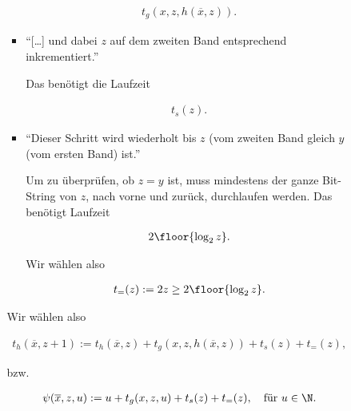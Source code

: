 \begin{solution}
\begin{enumerate}[wide, labelindent = 0pt]
\begin{itemize}
\begin{itemize}
\begin{itemize}
                \begin{align*}
                    t_g(x, z, h(\overline x, z)).
                \end{align*}

                \item \enquote{[\dots] und dabei $z$ auf dem zweiten Band entsprechend inkrementiert.}
                
                Das benötigt die Laufzeit

                \begin{align*}
                    t_s(z).
                \end{align*}

                \item \enquote{Dieser Schritt wird wiederholt bis $z$ (vom zweiten Band gleich $y$ (vom ersten Band) ist.}
                
                Um zu überprüfen, ob $z = y$ ist, muss mindestens der ganze Bit-String von $z$, nach vorne und zurück, durchlaufen werden.
                Das benötigt Laufzeit
                
                \begin{align*}
                    2 \floor{\log_2 z}.
                \end{align*}

                Wir wählen also

                \begin{align*}
                    t_=(z)
                    :=
                    2 z
                    \geq
                    2 \floor{\log_2 z}.
                \end{align*}

            \end{itemize}

            Wir wählen also

            \begin{align*}
                t_h(\overline x, z + 1)
                :=
                t_h(\overline x, z)
                +
                t_g(x, z, h(\overline x, z))
                +
                t_s(z)
                +
                t_=(z),
            \end{align*}

            bzw.

            \begin{align*}
                \psi(\overline x, z, u)
                :=
                u
                +
                t_g(x, z, u)
                +
                t_s(z)
                +
                t_=(z),
                \quad
                \text{für}~
                u \in \N.
            \end{align*}


\end{itemize}
\end{itemize}
\end{enumerate}
\end{solution}

